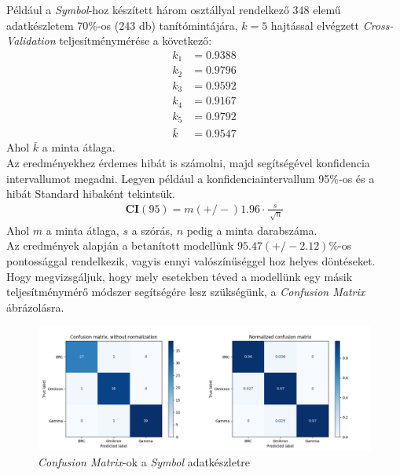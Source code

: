 Például a \textit{Symbol}-hoz készített három osztállyal rendelkező 348 elemű adatkészletem 70\%-os (243 db) tanítómintájára, $k=5$ hajtással elvégzett \textit{Cross-Validation} teljesítménymérése a következő:
\begin{align*}
	k_1 &= 0.9388\\
	k_2 &= 0.9796\\
	k_3 &= 0.9592\\
	k_4 &= 0.9167\\
	k_5 &= 0.9792\\
	\bar{k} &= 0.9547
\end{align*}
Ahol $\bar{k}$ a minta átlaga.\\
Az eredményekhez érdemes hibát is számolni, majd segítségével konfidencia intervallumot megadni. Legyen például a konfidenciaintervallum 95\%-os és a hibát Standard hibaként tekintsük.
\begin{align*}
	\boldsymbol{CI}(95) = m (+/-) 1.96 \cdot \frac{s}{\sqrt[]{n}}
\end{align*}
Ahol $m$ a minta átlaga, $s$ a szórás, $n$ pedig a minta darabszáma.\\
Az eredmények alapján a betanított modellünk $95.47 (+/- 2.12)$\%-os pontossággal rendelkezik, vagyis ennyi valószínűséggel hoz helyes döntéseket. Hogy megvizsgáljuk, hogy mely esetekben téved a modellünk egy másik teljesítménymérő módszer segítségére lesz szükségünk, a \textit{Confusion Matrix} ábrázolásra.


\begin{figure}[h]
\centering
\includegraphics[width=\textwidth]{images/confusion_m.png}
\caption{\textit{Confusion Matrix}-ok a \textit{Symbol} adatkészletre}
\label{fig:confusionm}
\end{figure}

